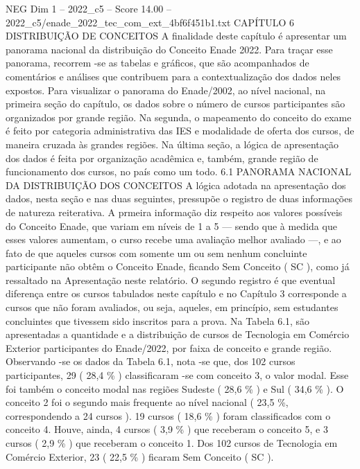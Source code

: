 \begin{textsample}{NEG Dim 1 – 2022\_c5 – Score 14.00 – 2022\_c5/enade\_2022\_tec\_com\_ext\_4bf6f451b1.txt}  \label{ex:f1_neg_412}
CAPÍTULO 6 DISTRIBUIÇÃO DE CONCEITOS A finalidade deste capítulo é apresentar um panorama nacional da distribuição do Conceito Enade 2022.
Para traçar esse panorama, recorrem -se as tabelas e gráficos, que são acompanhados de comentários e análises que contribuem para a contextualização dos dados neles expostos.
Para visualizar o panorama do Enade/2002, ao nível nacional, na primeira seção do capítulo, os dados sobre o número de cursos participantes são organizados por grande região.
Na segunda, o mapeamento do conceito do exame é feito por categoria administrativa das IES e modalidade de oferta dos cursos, de maneira cruzada às grandes regiões.
Na última seção, a lógica de apresentação dos dados é feita por organização acadêmica e, também, grande região de funcionamento dos cursos, no país como um todo. 6.1 PANORAMA NACIONAL DA DISTRIBUIÇÃO DOS CONCEITOS A lógica adotada na apresentação dos dados, nesta seção e nas duas seguintes, pressupõe o registro de duas informações de natureza reiterativa.
A prmeira informação diz respeito aos valores possíveis do Conceito Enade, que variam em níveis de 1 a 5 — sendo que à medida que esses valores aumentam, o curso recebe uma avaliação melhor avaliado —, e ao fato de que aqueles cursos com somente um ou sem nenhum concluinte participante não obtêm o Conceito Enade, ficando Sem Conceito ( SC ), como já ressaltado na Apresentação neste relatório.
O segundo registro é que eventual diferença entre os cursos tabulados neste capítulo e no Capítulo 3 corresponde a cursos que não foram avaliados, ou seja, aqueles, em princípio, sem estudantes concluintes que tivessem sido inscritos para a prova.
Na Tabela 6.1, são apresentadas a quantidade e a distribuição de cursos de Tecnologia em Comércio Exterior participantes do Enade/2022, por faixa de conceito e grande região.
Observando -se os dados da Tabela 6.1, nota -se que, dos 102 cursos participantes, 29 ( 28,4 \% ) classificaram -se com conceito 3, o valor modal.
Esse foi também o conceito modal nas regiões Sudeste ( 28,6 \% ) e Sul ( 34,6 \% ).
O conceito 2 foi o segundo mais frequente ao nível nacional ( 23,5 \%, correspondendo a 24 cursos ). 19 cursos ( 18,6 \% ) foram classificados com o conceito 4.
Houve, ainda, 4 cursos ( 3,9 \% ) que receberam o conceito 5, e 3 cursos ( 2,9 \% ) que receberam o conceito 1.
Dos 102 cursos de Tecnologia em Comércio Exterior, 23 ( 22,5 \% ) ficaram Sem Conceito ( SC ).

\end{textsample}
